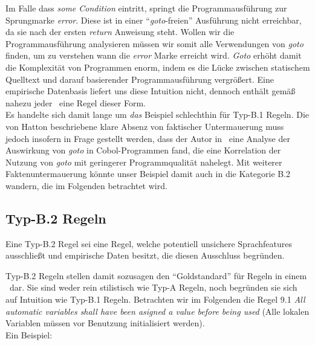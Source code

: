 \documentclass[a4paper,UKenglish,cleveref, autoref]{templates/lipics-v2019}
\begin{document}
    \noindent
    \begin{minipage}{\linewidth}
        \begin{example}
            
        \end{example}
    \end{minipage}

    Im Falle dass \textit{some Condition} eintritt, springt die Programmausführung zur Sprungmarke \textit{error}.
    Diese ist in einer \enquote{\textit{goto}-freien} Ausführung nicht erreichbar, da sie nach der ersten \textit{return}
    Anweisung steht.
    Wollen wir die Programmausführung analysieren müssen wir somit alle Verwendungen von \textit{goto} finden,
    um zu verstehen wann die \textit{error} Marke erreicht wird.
    \textit{Goto} erhöht damit die Komplexität von Programmen enorm, indem es die Lücke zwischen statischem
    Quelltext und darauf basierender Programmausführung vergrößert.\cite{goto-harmful}
    Eine empirische Datenbasis liefert uns diese Intuition nicht, dennoch enthält gemäß~\cite{hatton2004safer}
    nahezu jeder \sqs\ eine Regel dieser Form.\\
    Es handelte sich damit lange um \textit{das} Beispiel schlechthin für Typ-B.1 Regeln.
    Die von Hatton beschriebene klare Absenz von faktischer Untermauerung muss jedoch insofern in Frage gestellt werden,
    dass der Autor in~\cite{goto-study} eine Analyse der Auswirkung von \textit{goto} in Cobol-Programmen fand, die eine
    Korrelation der Nutzung von \textit{goto} mit geringerer Programmqualität nahelegt.
    Mit weiterer Faktenuntermauerung könnte unser Beispiel damit auch in die Kategorie B.2 wandern, die im Folgenden
    betrachtet wird.

    \subsection{Typ-B.2 Regeln}
    \label{subsec:typ-b-2-regeln}
    \begin{definition}
        Eine Typ-B.2 Regel sei eine Regel, welche potentiell unsichere Sprachfeatures ausschließt und empirische
        Daten besitzt, die diesen Ausschluss begründen.
    \end{definition}

    Typ-B.2 Regeln stellen damit sozusagen den \enquote{Goldstandard} für Regeln in einem \sqs\ dar.
    Sie sind weder rein stilistisch wie Typ-A Regeln, noch begründen sie sich auf Intuition wie Typ-B.1 Regeln.
    Betrachten wir im Folgenden die Regel 9.1 \textit{All automatic variables shall have been asigned a value before being used}
    (Alle lokalen Variablen müssen vor Benutzung initialisiert werden).\\
    Ein Beispiel:
\end{document}
